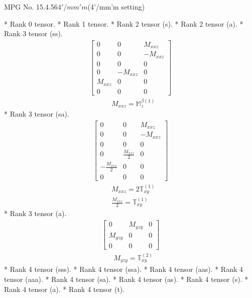 \documentclass[fleqn,8pt,landscape]{jsarticle}
\begin{document}
\setcounter{MaxMatrixCols}{32}

\renewcommand{\tablename}{Table~}
\renewcommand{\figurename}{Figure~}
\begin{center}
\LARGE
MPG No. 15.4.56\quad$4'/mm'm$\quad(4'/mm'm setting)
\end{center}
* Rank 0 tensor.
* Rank 1 tensor.
* Rank 2 tensor (s).
* Rank 2 tensor (a).
* Rank 3 tensor (ss).
\begin{align*}
\begin{bmatrix} 0 & 0 & M_{xxz} \\ 0 & 0 & - M_{xxz} \\ 0 & 0 & 0 \\ 0 & - M_{xxz} & 0 \\ M_{xxz} & 0 & 0 \\ 0 & 0 & 0 \end{bmatrix}
\end{align*}
\begin{align*}
& M_{xxz} = \mathbb{M}_{z}^{\beta(1)}
\end{align*}
* Rank 3 tensor (sa).
\begin{align*}
\begin{bmatrix} 0 & 0 & M_{xxz} \\ 0 & 0 & - M_{xxz} \\ 0 & 0 & 0 \\ 0 & \frac{M_{xxz}}{2} & 0 \\ - \frac{M_{xxz}}{2} & 0 & 0 \\ 0 & 0 & 0 \end{bmatrix}
\end{align*}
\begin{align*}
& M_{xxz} = 2 \mathbb{T}_{xy}^{(1)} \\
& \frac{M_{xxz}}{2} = \mathbb{T}_{xy}^{(1)}
\end{align*}
* Rank 3 tensor (a).
\begin{align*}
\begin{bmatrix} 0 & M_{yzy} & 0 \\ M_{yzy} & 0 & 0 \\ 0 & 0 & 0 \end{bmatrix}
\end{align*}
\begin{align*}
& M_{yzy} = \mathbb{T}_{xy}^{(2)}
\end{align*}
* Rank 4 tensor (sss).
* Rank 4 tensor (ssa).
* Rank 4 tensor (aas).
* Rank 4 tensor (aaa).
* Rank 4 tensor (sa).
* Rank 4 tensor (as).
* Rank 4 tensor (s).
* Rank 4 tensor (a).
* Rank 4 tensor (t).
\end{document}
